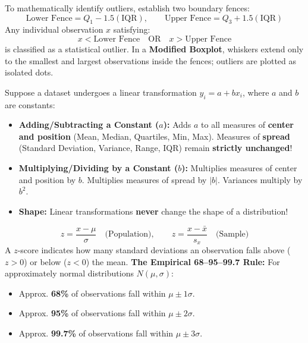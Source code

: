 \begin{lessonbox}
To mathematically identify outliers, establish two boundary fences:
\begin{equation}
  \text{Lower Fence} = Q_1 - 1.5(\text{IQR}), \qquad \text{Upper Fence} = Q_3 + 1.5(\text{IQR})
\end{equation}
Any individual observation $x$ satisfying:
\begin{equation}
  x < \text{Lower Fence} \quad \text{OR} \quad x > \text{Upper Fence}
\end{equation}
is classified as a statistical outlier. In a \textbf{Modified Boxplot}, whiskers extend only to the smallest and largest observations inside the fences; outliers are plotted as isolated dots.
\end{lessonbox}

\begin{lessonbox}
Suppose a dataset undergoes a linear transformation $y_i = a + b x_i$, where $a$ and $b$ are constants:
\begin{itemize}[leftmargin=1.2em]
  \item \textbf{Adding/Subtracting a Constant ($a$):} Adds $a$ to all measures of \textbf{center and position} (Mean, Median, Quartiles, Min, Max). Measures of \textbf{spread} (Standard Deviation, Variance, Range, IQR) remain \textbf{strictly unchanged}!
  \item \textbf{Multiplying/Dividing by a Constant ($b$):} Multiplies measures of center and position by $b$. Multiplies measures of spread by $|b|$. Variances multiply by $b^2$.
  \item \textbf{Shape:} Linear transformations \textbf{never} change the shape of a distribution!
\end{itemize}
\end{lessonbox}

\begin{lessonbox}
\begin{equation}
  z = \frac{x - \mu}{\sigma} \quad \text{(Population)}, \qquad z = \frac{x - \bar{x}}{s_x} \quad \text{(Sample)}
\end{equation}
A $z$-score indicates how many standard deviations an observation falls above ($z > 0$) or below ($z < 0$) the mean.
\textbf{The Empirical 68--95--99.7 Rule:}
For approximately normal distributions $N(\mu, \sigma)$:
\begin{itemize}[leftmargin=1.2em]
  \item Approx. \textbf{68\%} of observations fall within $\mu \pm 1\sigma$.
  \item Approx. \textbf{95\%} of observations fall within $\mu \pm 2\sigma$.
  \item Approx. \textbf{99.7\%} of observations fall within $\mu \pm 3\sigma$.
\end{itemize}
\end{lessonbox}

